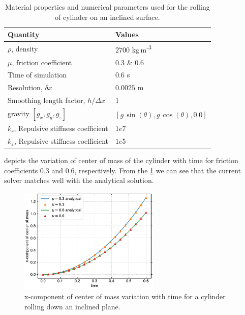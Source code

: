 \begin{table}[!ht]
  \centering
  \begin{tabular}[!ht]{ll}
    \toprule
    Quantity & Values\\
    \midrule
    $\rho$, density & $2700$ kg\,m\textsuperscript{-3} \\
    $\mu$, friction coefficient & $0.3$ \& $0.6$ \\
    Time of simulation & $0.6$ s \\
    Resolution, $\delta x$ & $0.0025$ m\\
    Smoothing length factor, $h/\Delta x$ & 1\\
    gravity $[g_x, g_y, g_z]$ & $[g\,\sin(\theta), g\,\cos(\theta), 0.0]$\\
    $k_r$, Repulsive stiffness coefficient & $1e7$ \\
    $k_f$, Repulsive stiffness coefficient & $1e5$ \\
    \bottomrule
  \end{tabular}
  \caption{Material properties and numerical parameters used for the rolling
    of cylinder on an inclined surface.}%
  \label{tab:circular-body-rolling-params}
\end{table}

 depicts the variation of center of mass of
the cylinder with time for friction coefficients $0.3$ and $0.6$,
respectively. From the \cref{fig:cylinder-xcom-vs-time} we can see that the
current solver matches well with the analytical solution.
\begin{figure}[!htpb]
  \centering
  \includegraphics[width=0.6\textwidth]{figures/rfc/figures/de_2021_cylinder_rolling_on_an_inclined_plane_2d/xcom_vs_time}
  \caption{x-component of center of mass variation with time for a cylinder
    rolling down an inclined plane.}
\label{fig:cylinder-xcom-vs-time}
\end{figure}


